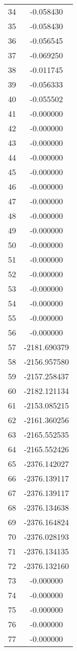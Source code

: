 \documentclass[12pt]{article}
\begin{document}
\begin{longtable}{@{}cc@{}}
34 & -0.058430 \\
35 & -0.058430 \\
36 & -0.056545 \\
37 & -0.069250 \\
38 & -0.011745 \\
39 & -0.056333 \\
40 & -0.055502 \\
41 & -0.000000 \\
42 & -0.000000 \\
43 & -0.000000 \\
44 & -0.000000 \\
45 & -0.000000 \\
46 & -0.000000 \\
47 & -0.000000 \\
48 & -0.000000 \\
49 & -0.000000 \\
50 & -0.000000 \\
51 & -0.000000 \\
52 & -0.000000 \\
53 & -0.000000 \\
54 & -0.000000 \\
55 & -0.000000 \\
56 & -0.000000 \\
57 & -2181.690379 \\
58 & -2156.957580 \\
59 & -2157.258437 \\
60 & -2182.121134 \\
61 & -2153.085215 \\
62 & -2161.360256 \\
63 & -2165.552535 \\
64 & -2165.552426 \\
65 & -2376.142027 \\
66 & -2376.139117 \\
67 & -2376.139117 \\
68 & -2376.134638 \\
69 & -2376.164824 \\
70 & -2376.028193 \\
71 & -2376.134135 \\
72 & -2376.132160 \\
73 & -0.000000 \\
74 & -0.000000 \\
75 & -0.000000 \\
76 & -0.000000 \\
77 & -0.000000 \\

\end{longtable}
\end{document}
